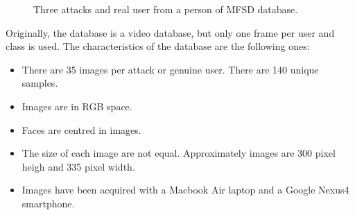 \begin{figure}[htb]
\centering
{}

\caption{Three attacks and  real user from a person of MFSD database.} \label{fig:mfsd}
\end{figure}

Originally, the database is a video database, but only one frame per user and class is used. The characteristics of the database are the following ones:
\begin{itemize}[itemsep=2pt,topsep=8pt,parsep=0pt,partopsep=20pt]
\item There are 35 images per attack or genuine user. There are 140 unique samples.
\item Images are in RGB space.
\item Faces are centred in images.
\item The size of each image are not equal. Approximately images are 300 pixel heigh and 335 pixel width.
\item Images have been acquired with a Macbook Air laptop and a Google Nexus4 smartphone.
\end{itemize}

